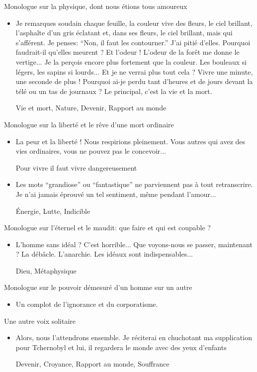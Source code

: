 \documentclass[french,a4paper,11pt,answers]{exam}
\newcommand{\cit}[2]{\og #1 \fg{} \begin{solution}{ #2 }\end{solution}} %
\begin{document}
	\begin{cadre}{Monologue sur la physique{,} dont nous étions tous amoureux}
		\begin{itemize}
			\item \cit{Je remarques soudain chaque feuille, la couleur vive des fleurs, le ciel brillant, l'asphalte d'un gris éclatant et, dans ses fleurs, le ciel brillant, mais qui s'afférent. Je penses: “Non, il faut les contourner.'' J'ai pitié d'elles. Pourquoi faudrait-il qu'elles meurent ? Et l'odeur ! L'odeur de la forêt me donne le vertige... Je la perçois encore plus fortement que la couleur. Les bouleaux si légers, les sapins si lourds... Et je ne verrai plus tout cela ? Vivre une minute, une seconde de plus ! Pourquoi ai-je perdu tant d'heures et de jours devant la télé ou un tas de journaux ? Le principal, c'est la vie et la mort.}{Vie et mort, Nature, Devenir, Rapport au monde}
		\end{itemize}
	\end{cadre}
	
	\begin{cadre}{Monologue sur la liberté et le rêve d'une mort ordinaire}
		\begin{itemize}
			\item \cit{La peur et la liberté ! Nous respirions pleinement. Vous autres qui avez des vies ordinaires, vous ne pouvez pas le concevoir...}{Pour vivre il faut vivre dangereusement}
			\item \cit{Les mots “grandiose'' ou “fantastique'' ne parviennent pas à tout retranscrire. Je n'ai jamais éprouvé un tel sentiment, même pendant l'amour...}{Énergie, Lutte, Indicible}
		\end{itemize}
	\end{cadre}
	
	\begin{cadre}{Monologue sur l'éternel et le maudit: que faire et qui est coupable ?}
		\begin{itemize}
			\item \cit{L'homme sans idéal ? C'est horrible... Que voyons-nous se passer, maintenant ? La débâcle. L'anarchie. Les idéaux sont indispensables...}{Dieu, Métaphysique}
		\end{itemize}
	\end{cadre}
	
	\begin{cadre}{Monologue sur le pouvoir démesuré d'un homme sur un autre}
		\begin{itemize}
			\item \cit{Un complot de l'ignorance et du corporatisme.}{}
		\end{itemize}
	\end{cadre}
	
	\begin{cadre}{Une autre voix solitaire}
		\begin{itemize}
			\item \cit{Alors, nous l'attendrons ensemble. Je réciterai en chuchotant ma supplication pour Tchernobyl et lui, il regardera le monde avec des yeux d'enfants}{Devenir, Croyance, Rapport au monde, Souffrance}
		\end{itemize}
	\end{cadre}
\end{document}

